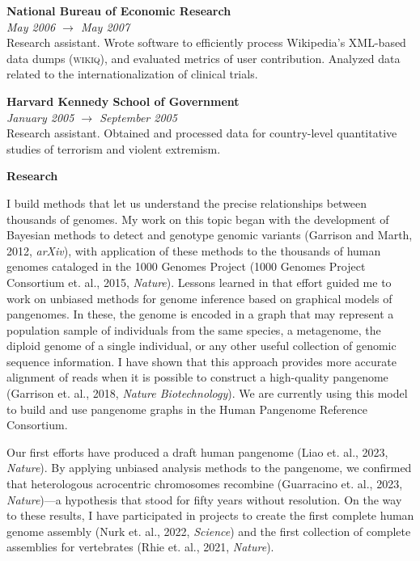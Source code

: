 \documentclass[11pt,hidelinks,letterpaper]{article}
\begin{document}
\hfill \break
\noindent
{\large \bf National Bureau of Economic Research} \\
\emph{May 2006 $\to$ May 2007} \\
Research assistant. Wrote software to efficiently process Wikipedia's XML-based data dumps (\textsc{wikiq}), and evaluated metrics of user contribution. Analyzed data related to the internationalization of clinical trials.

\hfill \break
\noindent
{\large \bf Harvard Kennedy School of Government} \\
\emph{January 2005 $\to$ September 2005} \\
Research assistant. Obtained and processed data for country-level quantitative studies of terrorism and violent extremism.

\hfill \break
\hfill \break
\noindent
{\LARGE \bf Research}
\hfill \break

\noindent
I build methods that let us understand the precise relationships between thousands of genomes.
My work on this topic began with the development of Bayesian methods to detect and genotype genomic variants (Garrison and Marth, 2012, \textit{arXiv}), with application of these methods to the thousands of human genomes cataloged in the 1000 Genomes Project (1000 Genomes Project Consortium et. al., 2015, \textit{Nature}).
Lessons learned in that effort guided me to work on unbiased methods for genome inference based on graphical models of pangenomes.
In these, the genome is encoded in a graph that may represent a population sample of individuals from the same species, a metagenome, the diploid genome of a single individual, or any other useful collection of genomic sequence information.
I have shown that this approach provides more accurate alignment of reads when it is possible to construct a high-quality pangenome (Garrison et. al., 2018, \textit{Nature Biotechnology}).
We are currently using this model to build and use pangenome graphs in the Human Pangenome Reference Consortium.

Our first efforts have produced a draft human pangenome (Liao et. al., 2023, \textit{Nature}).
By applying unbiased analysis methods to the pangenome, we confirmed that heterologous acrocentric chromosomes recombine (Guarracino et. al., 2023, \textit{Nature})---a hypothesis that stood for fifty years without resolution.
On the way to these results, I have participated in projects to create the first complete human genome assembly (Nurk et. al., 2022, \textit{Science}) and the first collection of complete assemblies for vertebrates (Rhie et. al., 2021, \textit{Nature}).
\end{document}
